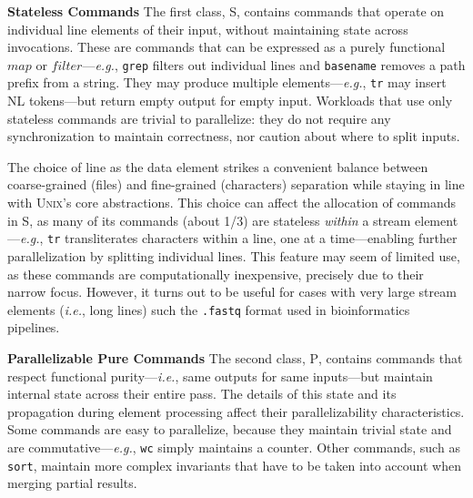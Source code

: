 \documentclass[sigplan, review, screen, anonymous]{acmart}
\newcommand{\eg}{{\em e.g.}, }
\newcommand{\ie}{{\em i.e.}, }
\newcommand{\heading}[1]{\vspace{4pt}\noindent\textbf{#1}\enspace}
\newcommand{\ttt}[1]{\texttt{#1}}
\newcommand{\cn}[1]{\mbox{\textcircled{\footnotesize #1}}}
\newcommand{\sta}{\cn{\textsc{S}}\xspace}
\newcommand{\pur}{\cn{\textsc{P}}\xspace}
\newcommand{\nv}[1]{[{\color{cyan}nv: #1}]}
\newcommand{\unix}{{\scshape Unix}\xspace}
\begin{document}

\heading{Stateless Commands}
The first class, \sta, contains commands that operate on individual line elements of their input, without maintaining state across invocations.
These are commands that can be expressed as a purely functional $map$ or $filter$---\eg \ttt{grep} filters out individual lines and \ttt{basename} removes a path prefix from a string.
They may produce multiple elements---\eg \ttt{tr} may insert {\sc NL} tokens---but return empty output for empty input.
Workloads that use only stateless commands are trivial to parallelize:
  they do not require any synchronization to maintain correctness, nor caution about where to split inputs.

The choice of line as the data element strikes a convenient balance between coarse-grained (files) and fine-grained (characters) separation while staying in line with \unix's core abstractions.
This choice can affect the allocation of commands in \sta, as many of its commands (about 1/3) are stateless \emph{within} a stream element---\eg\ttt{tr} transliterates characters within a line, one at a time---enabling further parallelization by splitting individual lines.
This feature may seem of limited use, as these commands are computationally inexpensive, precisely due to their narrow focus.
However, it turns out to be  useful for cases with very large stream elements (\ie long lines) such the \ttt{.fastq} format used in bioinformatics pipelines.  %


\heading{Parallelizable Pure Commands}
The second class, \pur, contains commands that respect functional purity---\ie same outputs for same inputs---but maintain internal state across their entire pass.
The details of this state and its propagation during element processing affect their parallelizability characteristics.
Some commands are easy to parallelize, because they maintain trivial state and are commutative---\eg \ttt{wc} simply maintains a counter.
Other commands, such as \ttt{sort}, maintain more complex invariants that have to be taken into account when merging partial results.
% 
\end{document}
